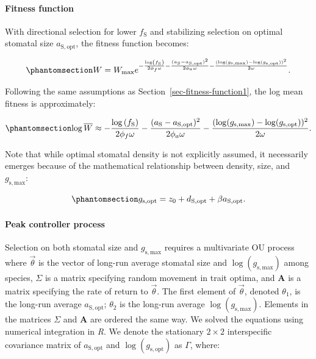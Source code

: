 \documentclass[
  letterpaper,
  DIV=11,
  numbers=noendperiod]{scrartcl}
\let\oldparagraph\paragraph
\renewcommand{\paragraph}[1]{\oldparagraph{#1}\mbox{}}
\begin{document}
\paragraph{Fitness function}\label{sec-fitness-function3}

With directional selection for lower \(f_\mathrm{S}\) and stabilizing
selection on optimal stomatal size \(a_{\mathrm{S,opt}}\), the fitness
function becomes:

\begin{equation}\phantomsection\label{eq-W3}{W = W_\mathrm{max} e ^ {- \frac{\log \left( f_\mathrm{S} \right)}{2 \phi_f \omega} -\frac{(a_\mathrm{S} - a_\mathrm{S,opt}) ^ 2}{2 \phi_a \omega} - \frac{(\log (g_\mathrm{s,max}) - \log (g_\mathrm{s,opt})) ^ 2}{2 \omega}}.}\end{equation}

Following the same assumptions as Section~\ref{sec-fitness-function1},
the log mean fitness is approximately:

\begin{equation}\phantomsection\label{eq-logW3}{\log \overline{W} \approx {- \frac{\log \left( f_\mathrm{S} \right)}{2 \phi_f \omega} -\frac{(a_\mathrm{S} - a_\mathrm{S,opt}) ^ 2}{2 \phi_a \omega} - \frac{(\log (g_\mathrm{s,max}) - \log (g_\mathrm{s,opt})) ^ 2}{2 \omega}}.}\end{equation}

Note that while optimal stomatal density is not explicitly assumed, it
necessarily emerges because of the mathematical relationship between
density, size, and \(g_\mathrm{s,max}\):

\begin{equation}\phantomsection\label{eq-dopt}{g_\mathrm{s,opt} = z_0 + d_\mathrm{S,opt} + \beta a_\mathrm{S,opt}.}\end{equation}

\paragraph{Peak controller process}\label{sec-peak-controller3}

Selection on both stomatal size and \(g_\mathrm{s,max}\) requires a
multivariate OU process where \(\vec{\theta}\) is the vector of long-run
average stomatal size and \(\log \left( g_\mathrm{s,max} \right)\) among
species, \(\Sigma\) is a matrix specifying random movement in trait
optima, and \(\mathbf{A}\) is a matrix specifying the rate of return to
\(\vec{\theta}\). The first element of \(\vec{\theta}\), denoted
\(\theta_1\), is the long-run average \(a_\mathrm{S,opt}\); \(\theta_2\)
is the long-run average \(\log \left( g_\mathrm{s,max} \right)\).
Elements in the matrices \(\Sigma\) and \(\mathbf{A}\) are ordered the
same way. We solved the equations using numerical integration in
\emph{R}. We denote the stationary \(2 \times 2\) interspecific
covariance matrix of \(a_\mathrm{S,opt}\) and
\(\log \left( g_\mathrm{s,opt} \right)\) as \(\Gamma\), where:
\end{document}
